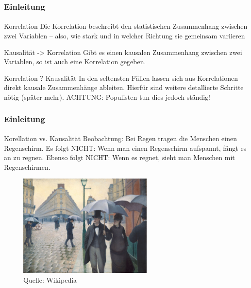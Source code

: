\documentclass{beamer}
\begin{document}
\begin{frame}
    \frametitle{Einleitung}
\framesubtitle{}

\begin{block}{Korrelation}
Die Korrelation beschreibt den statistischen Zusammenhang zwischen zwei Variablen – also, wie stark und in welcher Richtung sie gemeinsam variieren
\end{block}

\begin{block}{ Kausalität -> Korrelation}
Gibt es einen kausalen Zusammenhang zwischen zwei Variablen, so ist auch eine Korrelation gegeben. 
\end{block}
   
\begin{block}{Korrelation ? Kausalität}
    In den seltensten Fällen lassen sich aus Korrelationen  direkt kausale Zusammenhänge ableiten. 
    Hierfür sind weitere detallierte Schritte nötig (später mehr).
    ACHTUNG: Populisten tun dies jedoch ständig!
    \end{block}

\end{frame}






\begin{frame}
    \frametitle{Einleitung}
\framesubtitle{}

    \begin{block}{Korellation vs. Kausalität}
Beobachtung: Bei Regen tragen die Menschen einen Regenschirm.
Es folgt NICHT: Wenn man einen Regenschirm aufspannt, fängt es an zu regnen.
Ebenso folgt NICHT: Wenn es regnet, sieht man Menschen mit Regenschirmen. 
\end{block}


\begin{figure}[htp]
      \centering
    \includegraphics[width=0.6\textwidth]{img/Paris}

      \caption{Quelle: Wikipedia}
\end{figure}


\end{frame}
\end{document}

